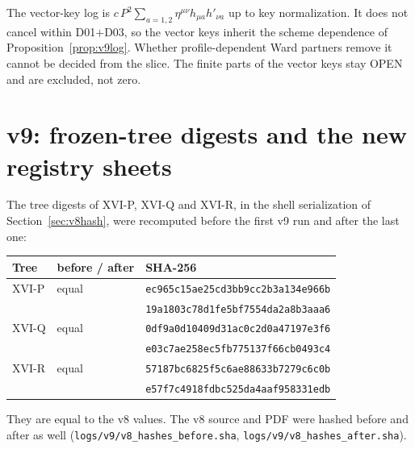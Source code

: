 \documentclass[11pt,a4paper]{article}
\newcommand{\loc}[1]{\nolinkurl{#1}}
\newcommand{\OPEN}{\textsf{OPEN}}
\theoremstyle{plain}
\theoremstyle{definition}
\theoremstyle{remark}
\numberwithin{equation}{section}
\begin{document}
The vector-key log is
\(c\,P^2\sum_{a=1,2}\eta^{\mu\nu}h_{\mu a}h'_{\nu a}\) up to key
normalization. It does not cancel within D01\(+\)D03, so the
vector keys inherit the scheme dependence of
Proposition~\ref{prop:v9log}. Whether profile-dependent Ward
partners remove it cannot be decided from the slice. The finite
parts of the vector keys stay \OPEN{} and are excluded, not zero.

\section{v9: frozen-tree digests and the new registry sheets}
\label{sec:v9hash}
\label{sec:v9sheets}

The tree digests of XVI-P, XVI-Q and XVI-R, in the shell
serialization of Section~\ref{sec:v8hash}, were recomputed before
the first v9 run and after the last one:
\begin{center}\scriptsize
\begin{tabular}{@{}lll@{}}
\toprule
Tree & before / after & SHA-256\\
\midrule
XVI-P & equal & \texttt{ec965c15ae25cd3bb9cc2b3a134e966b}\\ && \texttt{19a1803c78d1fe5bf7554da2a8b3aaa6}\\
XVI-Q & equal & \texttt{0df9a0d10409d31ac0c2d0a47197e3f6}\\ && \texttt{e03c7ae258ec5fb775137f66cb0493c4}\\
XVI-R & equal & \texttt{57187bc6825f5c6ae88633b7279c6c0b}\\ && \texttt{e57f7c4918fdbc525da4aaf958331edb}\\
\bottomrule
\end{tabular}
\end{center}
They are equal to the v8 values. The v8 source and PDF were
hashed before and after as well
(\loc{logs/v9/v8_hashes_before.sha}, \loc{logs/v9/v8_hashes_after.sha}).
\end{document}
